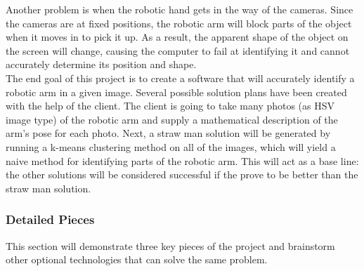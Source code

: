 \documentclass[10pt,journal,compsoc, draftclsnofoot,onecolumn]{IEEEtran}
\begin{document}
\noindent
Another problem is when the robotic hand gets in the way of the cameras. Since the cameras are at fixed positions, the robotic arm will block parts of the object when it moves in to pick it up. As a result, the apparent shape of the object on the screen will change, causing the computer to fail at identifying it and cannot accurately determine its position and shape. \\

\noindent
The end goal of this project is to create a software that will accurately identify a robotic arm in a given image. Several possible solution plans have been created with the help of the client. The client is going to take many photos (as HSV image type) of the robotic arm and supply a mathematical description of the arm's pose for each photo. Next, a straw man solution will be generated by running a k-means clustering method on all of the images, which will yield a naive method for identifying parts of the robotic arm. This will act as a base line: the other solutions will be considered successful if the prove to be better than the straw man solution.

\subsubsection{Detailed Pieces}
This section will demonstrate three key pieces of the project and brainstorm other optional technologies that can solve the same problem.
\end{document}
